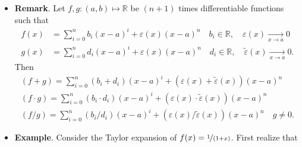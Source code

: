 \documentclass{article}
\newcommand{\R}{\mathbb{R}}
\newcommand{\?}{\stackrel{?}{=}}
\theoremstyle{definition} %
\begin{document}
\begin{itemize}
\begin{proof}
        \begin{align*}
            0 &= \sum_{i = k}^{n} \left(\frac{f^{(i)}(a)}{i!} - b_i\right)(x - a)^i + (\varepsilon(x) - \widetilde{\varepsilon}(x))(x - a)^n \\
            0 &= \sum_{i = k}^{n} \left(\frac{f^{(i)}(a)}{i!} - b_i\right)(x - a)^{i - k} + (\varepsilon(x) - \widetilde{\varepsilon}(x))(x - a)^{n - k} \tag{*} \\
            \implies &\lim_{x \to a} \sum_{i = k}^{n} \left(\frac{f^{(i)}(a)}{i!} - b_i\right)(x - a)^{i - k} + (\varepsilon(x) - \widetilde{\varepsilon}(x))(x - a)^{n - k} \\
            &= 0 = \frac{f^{(k)}(a)}{k!} - b_k.
        \end{align*}
        Therefore, $\nicefrac{f^{(i)}(a)}{i!} = b_i \ \forall i = 0, \ldots, n$ and by (*) we have
        \begin{alignat*}{2}
            && 0 &= (\varepsilon(x) - \widetilde{\varepsilon}(x))(x - a)^n \\
            \iff&& \varepsilon(x) &= \widetilde{\varepsilon}(x).
        \end{alignat*}
    \end{proof}
    \item \textbf{Remark}. Let $f, g: (a, b) \mapsto \R$ be $(n + 1)$ times differentiable functions such that
    \begin{align*}
        f(x) &= \sum_{i = 0}^{n} b_i (x - a)^i + \varepsilon(x)(x - a)^n \quad b_i \in \R, \quad \varepsilon(x) \underset{x \rightarrow a}{\longrightarrow} 0 \\
        g(x) &= \sum_{i = 0}^{n} d_i (x - a)^i + \varepsilon(x)(x - a)^n \quad d_i \in \R, \quad \widetilde{\varepsilon}(x) \underset{x \rightarrow a}{\longrightarrow} 0.
    \end{align*}
    Then
    \begin{align*}
        (f + g) = \sum_{i = 0}^{n} (b_i + d_i)(x - a)^i + (\varepsilon(x) + \widetilde{\varepsilon}(x))(x - a)^n \\
        (f \cdot g) = \sum_{i = 0}^{n} (b_i \cdot d_i)(x - a)^i + (\varepsilon(x) \cdot \widetilde{\varepsilon}(x))(x - a)^n \\
        (f / g) = \sum_{i = 0}^{n} (b_i / d_i)(x - a)^i + (\varepsilon(x) / \widetilde{\varepsilon}(x))(x - a)^n \quad g \neq 0.
    \end{align*}
    \item \textbf{Example}. Consider the Taylor expansion of $f(x) = \nicefrac{1}{(1 + x)}$. First realize that

\end{itemize}
\end{document}

